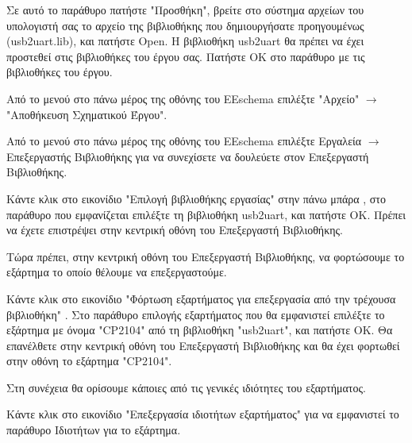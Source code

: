 \documentclass[a4paper]{article}
\begin{document}
Σε αυτό το παράθυρο πατήστε "Προσθήκη", βρείτε στο σύστημα αρχείων του υπολογιστή σας το αρχείο της βιβλιοθήκης που δημιουργήσατε προηγουμένως (\textenglish{usb2uart.lib}), και πατήστε Open. Η βιβλιοθήκη usb2uart θα πρέπει να έχει προστεθεί στις βιβλιοθήκες του έργου σας. Πατήστε ΟΚ στο παράθυρο με τις βιβλιοθήκες του έργου.

\begin{figure}
  \begin{center}
    \label{fig:kicad-main}
  \end{center}
\end{figure}

Από το μενού στο πάνω μέρος της οθόνης του \textenglish{EEschema} επιλέξτε "Αρχείο" $\rightarrow$ "Αποθήκευση Σχηματικού Έργου".

Από το μενού στο πάνω μέρος της οθόνης του \textenglish{EEschema} επιλέξτε Εργαλεία $\rightarrow$ Επεξεργαστής Βιβλιοθήκης για να συνεχίσετε να δουλεύετε στον Επεξεργαστή Βιβλιοθήκης.

Κάντε κλικ στο εικονίδιο "Επιλογή βιβλιοθήκης εργασίας" στην πάνω μπάρα %
, στο παράθυρο που εμφανίζεται επιλέξτε τη βιβλιοθήκη usb2uart, και πατήστε ΟΚ. Πρέπει να έχετε επιστρέψει στην κεντρική οθόνη του Επεξεργαστή Βιβλιοθήκης.

\begin{figure}
  \begin{center}
    \label{fig:kicad-main}
  \end{center}
\end{figure}

Τώρα πρέπει, στην κεντρική οθόνη του Επεξεργαστή Βιβλιοθήκης, να φορτώσουμε το εξάρτημα το οποίο θέλουμε να επεξεργαστούμε. 

Κάντε κλικ στο εικονίδιο "Φόρτωση εξαρτήματος για επεξεργασία από την τρέχουσα βιβλιοθήκη" %
. Στο παράθυρο επιλογής εξαρτήματος που θα εμφανιστεί επιλέξτε το εξάρτημα με όνομα "\textenglish{CP2104}" από τη βιβλιοθήκη "usb2uart", και πατήστε ΟΚ. Θα επανέλθετε στην κεντρική οθόνη του Επεξεργαστή Βιβλιοθήκης και θα έχει φορτωθεί στην οθόνη το εξάρτημα "\textenglish{CP2104}".

Στη συνέχεια θα ορίσουμε κάποιες από τις γενικές ιδιότητες του εξαρτήματος. 

Κάντε κλικ στο εικονίδιο "Επεξεργασία ιδιοτήτων εξαρτήματος" %
για να εμφανιστεί το παράθυρο Ιδιοτήτων για το εξάρτημα. 
\end{document}
